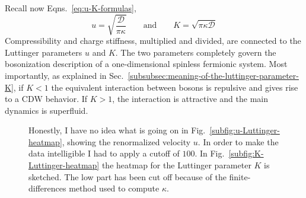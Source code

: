 Recall now Eqns.~\eqref{eq:u-K-formulas},
\[
	u = \sqrt{\frac{\mathcal{D}}{\pi\kappa}}
	\qquad\text{and}\qquad
	K = \sqrt{\pi\kappa\mathcal{D}}
\]
Compressibility and charge stiffness, multiplied and divided, are connected to the Luttinger parameters $u$ and $K$. The two parameters completely govern the bosonization description of a one-dimensional spinless fermionic system. Most importantly, as explained in Sec.~\ref{subsubsec:meaning-of-the-luttinger-parameter-K}, if $K < 1$ the equivalent interaction between bosons is repulsive and gives rise to a $\mathrm{CDW}$ behavior. If $K > 1$, the interaction is attractive and the main dynamics is superfluid.

\begin{figure}
	\centering	
	\caption{Honestly, I have no idea what is going on in Fig.~\ref{subfig:u-Luttinger-heatmap}, showing the renormalized velocity $u$. In order to make the data intelligible I had to apply a cutoff of $100$. In Fig.~\ref{subfig:K-Luttinger-heatmap} the heatmap for the Luttinger parameter $K$ is sketched. The low part has been cut off because of the finite-differences method used to compute $\kappa$.}
	\label{fig:Luttinger-heatmaps}
\end{figure}

